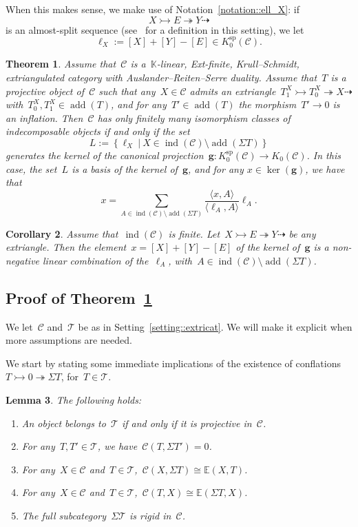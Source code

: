 \documentclass{amsart}
\newtheorem{theorem}{Theorem}[section]
\newtheorem{corollary}[theorem]{Corollary}
\newtheorem{lemma}[theorem]{Lemma}
\theoremstyle{definition}
\renewcommand{\b}[1]{{\boldsymbol{#1}}} %
\newcommand{\field}{\mathbb{K}}
\newcommand{\cat}{\mathcal{C}}
\newcommand{\susp}{\Sigma}
\newcommand{\add}{\operatorname{add}}
\newcommand{\spl}{\operatorname{sp}}
\newcommand{\Ksp}{K_0^{\spl}}
\newcommand{\ind}{\operatorname{ind}}
\newcommand{\tc}{\mathcal{T}}
\newcommand{\infl}{\rightarrowtail}
\newcommand{\defl}{\twoheadrightarrow}
\newcommand{\kzero}[1]{K_0(#1)}
\begin{document}
When this makes sense, we make use of Notation~\ref{notation::ell_X}: if
\[
X \infl E \defl Y \dashrightarrow
\]
is an almost-split sequence (see~\cite{IyamaNakaokaPalu} for a definition in this setting), we let
\[
 \ell_X := [X]+[Y]-[E]\in\Ksp(\cat).
\]


\begin{theorem}\label{theorem::extricats}
Assume that~$\cat$ is a~$\field$-linear, Ext-finite, Krull--Schmidt, extriangulated category with Auslander--Reiten--Serre duality.
Assume that~$T$ is a projective object of~$\cat$ such that any~$X\in\cat$ admits an extriangle~$T_1^X\infl T_0^X\defl X\dashrightarrow$ with~$T_0^X, T_1^X\in\add(T)$, and for any~$T'\in\add(T)$ the morphism~$T'\to 0$ is an inflation. Then~$\cat$ has only finitely many isomorphism classes of indecomposable objects if and only if the set
\[
 L:=\left\{\ell_X \ | \ X\in \ind(\cat)\setminus \add(\susp T) \right\}
\]
generates the kernel of the canonical projection~$\b g:\Ksp(\cat) \to \kzero{\cat}$. 
In this case, the set~$L$ is a basis of the kernel of~$\b g$, and for any $x\in \ker(\b g)$, we have that
 \[
  x= \sum_{A\in \ind(\cat) \setminus \add(\susp T)} \frac{\langle x, A \rangle}{\langle \ell_A, A \rangle} \ell_A.
 \]
\end{theorem}

\begin{corollary}
Assume that~$\ind(\cat)$ is finite.
Let~$X\infl E\defl Y\dashrightarrow$ be any extriangle.
Then the element~$x=[X]+[Y]-[E]$ of the kernel of~$\b g$ is a non-negative linear combination of the~$\ell_A$, with~$A\in\ind(\cat)\setminus\add(\susp T)$.
\end{corollary}

\subsection{Proof of Theorem~\ref{theorem::extricats}}

We let~$\cat$ and~$\tc$ be as in Setting~\ref{setting::extricat}.
We will make it explicit when more assumptions are needed.

We start by stating some immediate implications of the existence of conflations~$T\infl 0 \defl \susp T$, for~$T\in\tc$.

\begin{lemma}
The following holds:
\begin{enumerate}[{\rm (a)}]
 \item An object belongs to~$\tc$ if and only if it is projective in~$\cat$.
 \item For any~$T,T'\in\tc$, we have~$\cat(T,\susp T')=0$.
 \item For any~$X\in\cat$ and~$T\in\tc$,~$\cat(X,\susp T)\cong\mathbb{E}(X,T)$.
 \item For any~$X\in\cat$ and~$T\in\tc$,~$\cat(T,X)\cong\mathbb{E}(\susp T,X)$.
 \item The full subcategory~$\susp\tc$ is rigid in~$\cat$.
\end{enumerate}
\end{lemma}
\end{document}
